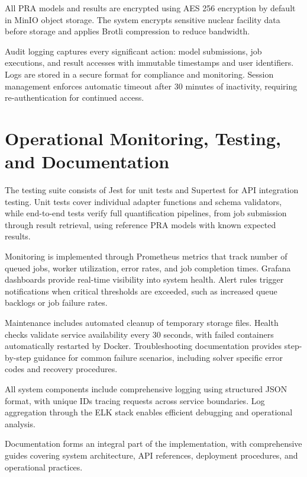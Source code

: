 All PRA models and results are encrypted using AES 256 encryption by default in MinIO object storage. The system encrypts sensitive nuclear facility data before storage and applies Brotli \cite{brotli} compression to reduce bandwidth.

Audit logging captures every significant action: model submissions, job executions, and result accesses with immutable timestamps and user identifiers. Logs are stored in a secure format for compliance and monitoring. Session management enforces automatic timeout after 30 minutes of inactivity, requiring re-authentication for continued access.

\section{Operational Monitoring, Testing, and Documentation}
The testing suite consists of Jest for unit tests and Supertest for API integration testing. Unit tests cover individual adapter functions and schema validators, while end-to-end tests verify full quantification pipelines, from job submission through result retrieval, using reference PRA models with known expected results.

Monitoring is implemented through Prometheus metrics that track number of queued jobs, worker utilization, error rates, and job completion times. Grafana dashboards provide real-time visibility into system health. Alert rules trigger notifications when critical thresholds are exceeded, such as increased queue backlogs or job failure rates.

Maintenance includes automated cleanup of temporary storage files. Health checks validate service availability every 30 seconds, with failed containers automatically restarted by Docker. Troubleshooting documentation provides step-by-step guidance for common failure scenarios, including solver specific error codes and recovery procedures.

All system components include comprehensive logging using structured JSON format, with unique IDs tracing requests across service boundaries. Log aggregation through the ELK stack enables efficient debugging and operational analysis.

Documentation forms an integral part of the implementation, with comprehensive guides covering system architecture, API references, deployment procedures, and operational practices. 

%